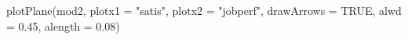 \begin{Schunk}
\begin{Sinput}
 plotPlane(mod2, plotx1 = "satis", plotx2 = "jobperf", drawArrows = TRUE, alwd = 0.45, alength = 0.08)
\end{Sinput}
\end{Schunk}
